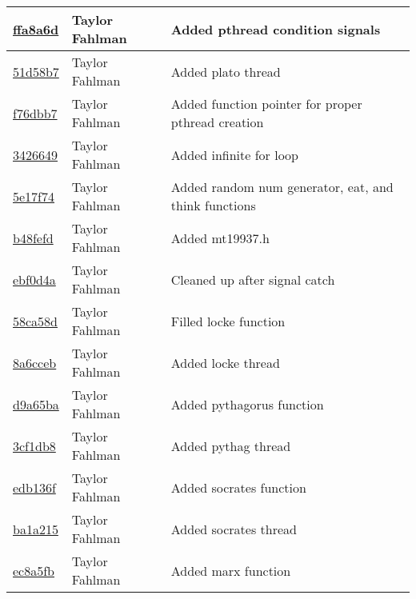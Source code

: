 \begin{tabular}{l l l}
\href{https://github.com/fahlmant/cs444/commit/ffa8a6dcce81ffcaa6b0953ac7e66c13a5eebf23}{ffa8a6d} & Taylor Fahlman & Added pthread condition signals\\\hline
\href{https://github.com/fahlmant/cs444/commit/51d58b7179ad83063834c6bf5eac684dbe2dcea1}{51d58b7} & Taylor Fahlman & Added plato thread\\\hline
\href{https://github.com/fahlmant/cs444/commit/f76dbb79c66c9c07cf4077e12042e9a2e0fd820f}{f76dbb7} & Taylor Fahlman & Added function pointer for proper pthread creation\\\hline
\href{https://github.com/fahlmant/cs444/commit/3426649ae1918162e2ffc19e8b76ffebcbfeafb6}{3426649} & Taylor Fahlman & Added infinite for loop\\\hline
\href{https://github.com/fahlmant/cs444/commit/5e17f747c9f116ab75a330d8ce0bfdb3f3ec35ab}{5e17f74} & Taylor Fahlman & Added random num generator, eat, and think functions\\\hline
\href{https://github.com/fahlmant/cs444/commit/b48fefd146280d909c6cf2155b3fe1fdec0a3974}{b48fefd} & Taylor Fahlman & Added mt19937.h\\\hline
\href{https://github.com/fahlmant/cs444/commit/ebf0d4a0840a6a6bb8b17916dc160c469197593d}{ebf0d4a} & Taylor Fahlman & Cleaned up after signal catch\\\hline
\href{https://github.com/fahlmant/cs444/commit/58ca58d458e413a75a8c02487bb65cf6acef3d59}{58ca58d} & Taylor Fahlman & Filled locke function\\\hline
\href{https://github.com/fahlmant/cs444/commit/8a6cceb7c92a712f5428de6f30d8c77f80e8dc16}{8a6cceb} & Taylor Fahlman & Added locke thread\\\hline
\href{https://github.com/fahlmant/cs444/commit/d9a65baf438b66b6e0a9fd4cbfdf14bbb4244d5c}{d9a65ba} & Taylor Fahlman & Added pythagorus function\\\hline
\href{https://github.com/fahlmant/cs444/commit/3cf1db8bc4cada1b6be913bc35423bd7d5f15855}{3cf1db8} & Taylor Fahlman & Added pythag thread\\\hline
\href{https://github.com/fahlmant/cs444/commit/edb136fac1c4ed5c5317f7a7a967bad090b32c86}{edb136f} & Taylor Fahlman & Added socrates function\\\hline
\href{https://github.com/fahlmant/cs444/commit/ba1a2150d205c820597bf84f89c025edfb785238}{ba1a215} & Taylor Fahlman & Added socrates thread\\\hline
\href{https://github.com/fahlmant/cs444/commit/ec8a5fbea281d6bffd2f3df386889152fadb13bc}{ec8a5fb} & Taylor Fahlman & Added marx function\\\hline

\end{tabular}
